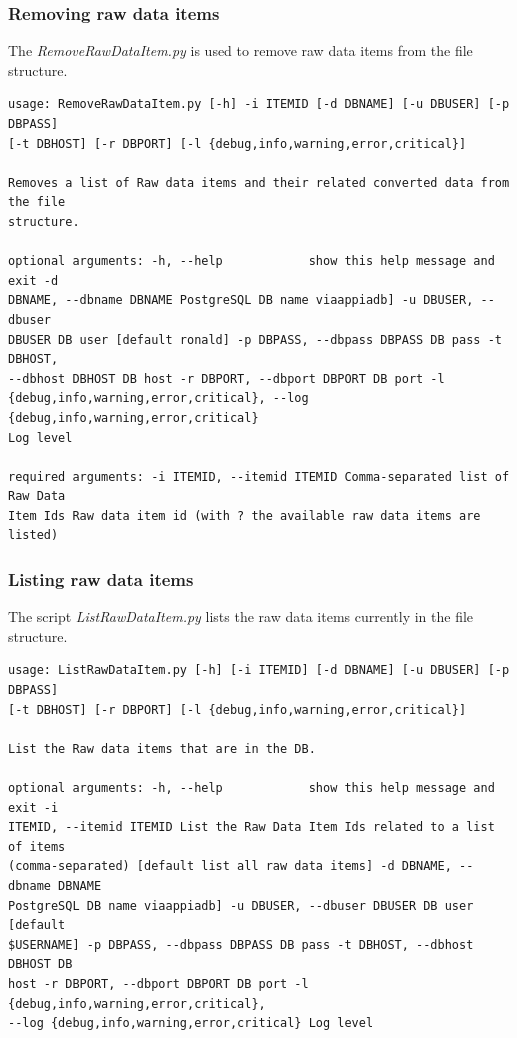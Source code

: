 \subsubsection{Removing raw data items}
\label{sec:removeraw} 
The \textit{RemoveRawDataItem.py} is used to remove raw data items from the file
structure. 
\begin{Verbatim}[fontfamily=courier,commandchars=\\\{\},fontsize=\footnotesize]
usage: RemoveRawDataItem.py [-h] -i ITEMID [-d DBNAME] [-u DBUSER] [-p DBPASS]
[-t DBHOST] [-r DBPORT] [-l {debug,info,warning,error,critical}]

Removes a list of Raw data items and their related converted data from the file
structure.

optional arguments: -h, --help            show this help message and exit -d
DBNAME, --dbname DBNAME PostgreSQL DB name viaappiadb] -u DBUSER, --dbuser
DBUSER DB user [default ronald] -p DBPASS, --dbpass DBPASS DB pass -t DBHOST,
--dbhost DBHOST DB host -r DBPORT, --dbport DBPORT DB port -l
{debug,info,warning,error,critical}, --log {debug,info,warning,error,critical}
Log level

required arguments: -i ITEMID, --itemid ITEMID Comma-separated list of Raw Data
Item Ids Raw data item id (with ? the available raw data items are listed)
\end{Verbatim}

\subsubsection{Listing raw data items}
\label{sec:listraw} 
The script \textit{ListRawDataItem.py} lists the raw data items currently in the
file structure.
\begin{Verbatim}[fontfamily=courier,commandchars=\\\{\},fontsize=\footnotesize]
usage: ListRawDataItem.py [-h] [-i ITEMID] [-d DBNAME] [-u DBUSER] [-p DBPASS]
[-t DBHOST] [-r DBPORT] [-l {debug,info,warning,error,critical}]

List the Raw data items that are in the DB.

optional arguments: -h, --help            show this help message and exit -i
ITEMID, --itemid ITEMID List the Raw Data Item Ids related to a list of items
(comma-separated) [default list all raw data items] -d DBNAME, --dbname DBNAME
PostgreSQL DB name viaappiadb] -u DBUSER, --dbuser DBUSER DB user [default
$USERNAME] -p DBPASS, --dbpass DBPASS DB pass -t DBHOST, --dbhost DBHOST DB
host -r DBPORT, --dbport DBPORT DB port -l {debug,info,warning,error,critical},
--log {debug,info,warning,error,critical} Log level

\end{Verbatim}

